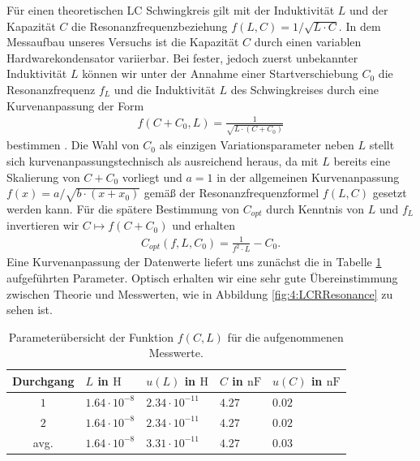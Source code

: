 \documentclass[../../main.tex]{subfiles}
\begin{document}
        Für einen theoretischen LC Schwingkreis gilt mit der Induktivität $L$ und der Kapazität $C$ die Resonanzfrequenzbeziehung $f(L,C) = 1/\sqrt{L\cdot C}$. In dem Messaufbau unseres Versuchs ist die Kapazität $C$ durch einen variablen Hardwarekondensator variierbar. Bei fester, jedoch zuerst unbekannter Induktivität $L$ können wir unter der Annahme einer Startverschiebung $C_0$ die Resonanzfrequenz $f_L$ und die Induktivität $L$ des Schwingkreises durch eine Kurvenanpassung der Form 
        \begin{align}
            f(C + C_0,L) = \frac{1}{\sqrt{L\cdot (C + C_0)}}
        \end{align}
        bestimmen \cite[ch 1.4.3]{doc:EFNMRStudentManual}. Die Wahl von $C_0$ als einzigen Variationsparameter neben $L$ stellt sich kurvenanpassungstechnisch als ausreichend heraus, da mit $L$ bereits eine Skalierung von $C + C_0$ vorliegt und $a=1$ in der allgemeinen Kurvenanpassung $f(x) = a / \sqrt{b\cdot (x + x_0)}$ gemäß der Resonanzfrequenzformel $f(L,C)$ gesetzt werden kann.
        Für die spätere Bestimmung von $C_{opt}$ durch Kenntnis von $L$ und $f_L$ invertieren wir $C\mapsto f(C + C_0)$ und erhalten 
        \begin{align}
            C_{opt}(f,L,C_0) = \frac{1}{f^2\cdot L} - C_0. \label{eq:4:Capacitance}
        \end{align}
        Eine Kurvenanpassung der Datenwerte liefert uns zunächst die in Tabelle \ref{tab:4:LCRResonance} aufgeführten Parameter. Optisch erhalten wir eine sehr gute Übereinstimmung zwischen Theorie und Messwerten, wie in Abbildung \ref{fig:4:LCRResonance} zu sehen ist.
        \begin{table}[H]
            \centering
            \begin{tabular}{c|ll|ll}
                 \textbf{Durchgang} & $L$ in $\si{\henry}$ & $u(L)$ in $\si{\henry}$ & $C$ in $\si{\nano\farad}$ & $u(C)$ in $\si{\nano\farad}$ \\
                \hline
                $1$ & $1.64\cdot 10^{-8}$ & $2.34\cdot 10^{-11}$ & $4.27$ & $0.02$ \\
                $2$ & $1.64\cdot 10^{-8}$ & $2.34\cdot 10^{-11}$ & $4.27$ & $0.02$ \\
                \hline
                avg. & $1.64\cdot 10^{-8}$ & $3.31\cdot 10^{-11}$ & $4.27$ & $0.03$
            \end{tabular} 
            \caption{Parameterübersicht der Funktion $f(C,L)$ für die aufgenommenen Messwerte.}
            \label{tab:4:LCRResonance}
        \end{table}
\end{document}
